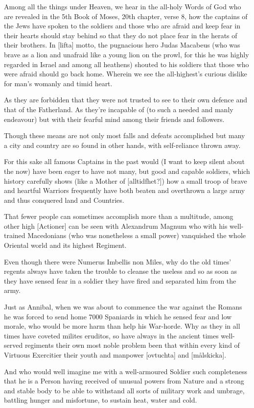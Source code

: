 \newpage


\newpage


Among all the things under Heaven, we hear in the all-holy Words of
God who are revealed in the 5th Book of Moses, 20th chapter,
verse 8, how the captains of the Jews have spoken to the soldiers and
those who are afraid and keep fear in their hearts should stay behind
so that they do not place fear in the herats of their brothers. In
[lifta] motto, the pugnacious hero Judas Macabeus (who was brave as a
lion and unafraid like a young lion on the prowl, for this he was
highly regarded in Israel and among all heathens) shouted to his
soldiers that those who were afraid should go back home. Wherein we
see the all-highest's curious dislike for man's womanly and timid
heart.

As they are forbidden that they were not trusted to see to their own
defence and that of the Fatherland. As they're incapable of (to such a
needed and manly endeavour) but with their fearful mind among their
friends and followers. 

Though these means are not only most falls and defeats accomplished
but many a city and country are so found in other hands, with
self-reliance thrown away.

For this sake all famous Captains in the past would (I want to
keep silent about the now) have been eager to have not many, but good
and capable soldiers, which history carefully shows (like a Mother of
[alltidfhet?]) how a small troop of brave and heartful Warriors
frequently have both beaten and overthrown a large army and thus
conquered land and Countries.

That fewer people can sometimes accomplish more than a multitude,
among other high [Actioner] can be seen with Alexandrum Magnum who
with his well-trained Macedonians (who was nonetheless a small power)
vanquished the whole Oriental world and its highest Regiment.

Even though there were Numerus Imbellis non Miles, why do the old
times' regents always have taken the trouble to cleanse the
useless and so as soon as they have sensed fear in a soldier they have
fired and
separated him from the army. 

Just as Annibal, when we was about to
commence the war against the Romans he was forced to send home 7000
Spaniards in which he sensed
fear and low morale, who would be more harm than help his
War-horde. Why as they in all times have coveted milites eruditos, so
have always in the ancient times well-served regiments their own most
noble problem been that within every kind of Virtuous Exercitier their
youth and manpower [ovtuchta] and [målskicka].

And who would well imagine me with a well-armoured Soldier such
completeness that he is a Person having received of unusual powers
from Nature and a strong and stable body to be able to withstand all
sorts of military work and umbrage, battling hunger and misfortune, to
sustain heat, water and cold.
